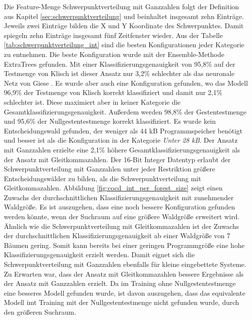 Die Feature-Menge Schwerpunktverteilung mit Ganzzahlen folgt der Definition aus Kapitel \ref{sec:schwerpunktverteilung} und beinhaltet insgesamt zehn Einträge. Jeweils zwei Einträge bilden die X und Y
Koordinate des Schwerpunktes. Damit spiegeln zehn Einträge insgesamt fünf Zeitfenster wieder.
\newline
\newline
Aus der Tabelle \ref{tab:schwerpunktverteilung_int} sind die besten Konfigurationen jeder Kategorie zu entnehmen. Die beste Konfiguration wurde mit der Ensemble-Methode ExtraTrees gefunden.
Mit einer Klassifizierungsgenauigkeit von 95,8\% auf der Testmenge von Klisch ist dieser Ansatz nur 3,2\% schlechter als das neuronale Netz von Giese \cite{gieseThesis}. Es wurde aber auch eine Konfiguration
gefunden, wo das Modell 96,9\% der Testmenge von Klisch korrekt klassifiziert und damit nur 2,1\% schlechter ist. Diese maximiert aber in keiner Kategorie die Gesamtklassifizierungsgenauigkeit.
Außerdem werden 98,8\% der Gestentestmenge und 95,6\% der Nullgestentestmenge korrekt klassifiziert. Es wurde kein Entscheidungswald gefunden, der weniger als 44 kB Programmspeicher benötigt und besser ist als die
Konfiguration in der Kategorie \textit{Unter 28 kB}.
\newline
\newline
Der Ansatz mit Ganzzahlen erzielte eine 2,1\% höhere Gesamtklassifizierungsgenauigkeit als der Ansatz mit Gleitkommazahlen. Der 16-Bit Integer Datentyp erlaubt der Schwerpunktverteilung mit Ganzzahlen unter jeder
Restriktion größere Entscheidungswälder zu bilden, als die Schwerpunktverteilung mit Gleitkommazahlen. Abbildung \ref{fig:cocd_int_per_forest_size} zeigt einen Zuwachs der durchschnittlichen Klassifizierungsgenauigkeit
mit zunehmender Waldgröße. Es ist auszugehen, dass eine noch bessere Konfiguration gefunden werden könnte, wenn der Suchraum auf eine größere Waldgröße erweitert wird. Ähnlich wie die Schwerpunktverteilung mit
Gleitkommazahlen ist der Zuwachs der durchschnittlichen Klassifizierungsgenauigkeit ab einer Waldgröße von 7 Bäumen gering. Somit kann bereits bei einer geringen Programmgröße eine hohe Klassifizierungsgenauigkeit
erzielt werden. Damit eignet sich die Schwerpunktverteilung mit Ganzzahlen ebenfalls für kleine eingebettete Systeme.
\newline
\newline
Zu Erwarten war, dass der Ansatz mit Gleitkommazahlen bessere Ergebnisse als der Ansatz mit Ganzzahlen erzielt. Da im Training ohne Nullgestentestmenge eine besseres Modell gefunden wurde, ist davon
auszugehen, dass das equivalente Modell imt Training mit der Nullgestentestmenge nicht gefunden wurde, durch den größeren Suchraum.